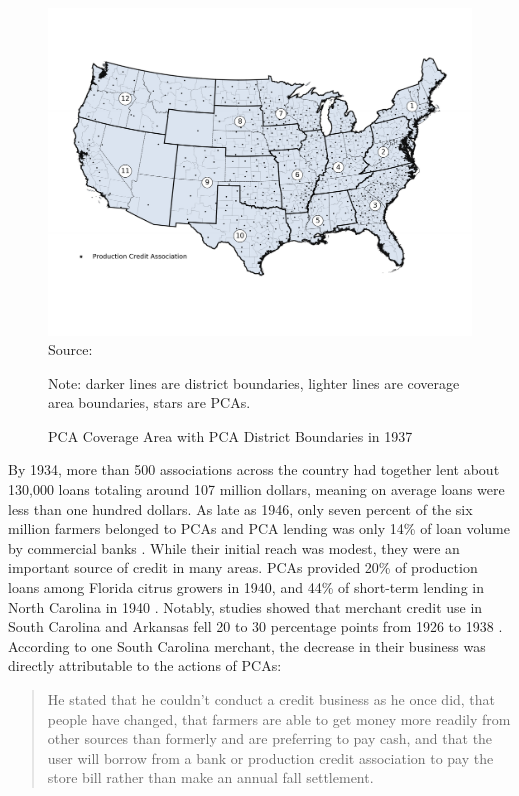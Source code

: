 \documentclass[12pt]{article}
\begin{document}
\begin{figure}
    \centering
    \caption{PCA Coverage Area with PCA District Boundaries in 1937}
\includegraphics[width=1\textwidth]{PCA_districts}
\label{coverage_area}
Source: \citet{pca_location}

\footnotesize Note: darker lines are district boundaries, lighter lines are coverage area boundaries, stars are PCAs.
\end{figure}


By 1934, more than 500 associations across the country had together lent about 130,000 loans totaling around 107 million dollars, meaning on average loans were less than one hundred dollars. 
As late as 1946, only seven percent of the six million farmers belonged to PCAs and PCA lending was only 14\% of loan volume by commercial banks \citep{Arnold1958}. 
While their initial reach was modest, they were an important source of credit in many areas.
PCAs provided 20\% of production loans among Florida citrus growers in 1940, and 44\% of short-term lending in North Carolina in 1940 \citep{Reitz1942,Lange1944}. 
Notably, studies showed that merchant credit use in South Carolina and Arkansas fell 20 to 30 percentage points from 1926 to 1938 \citep{Sparlin1940,Moore1929,Ferrier1940,wickens_agricultural_1931}.
According to one South Carolina merchant, the decrease in their business was directly attributable to the actions of PCAs:

\begin{quote}
He stated that he couldn't conduct a credit business as he once did, that people have changed, that farmers are able to get money more readily from other sources than formerly and are preferring to pay cash, and that the user will borrow from a bank or production credit association to pay the store bill rather than make an annual fall settlement. \citep[pg. 35]{Ferrier1940}
\end{quote}
\end{document}
